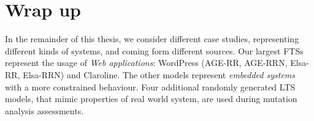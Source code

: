 \section{Wrap up}

In the remainder of this thesis, we consider different case studies, representing different kinds of systems, and coming form different sources. Our largest \glspl{FTS} represent the usage of \emph{Web applications}: WordPress (AGE-RR, AGE-RRN, Elsa-RR, Elsa-RRN) and Claroline.
%
The other models represent \emph{embedded systems} with a more constrained behaviour. 
%
Four additional randomly generated LTS models, that mimic properties of real world system, are used during mutation analysis assessments.






